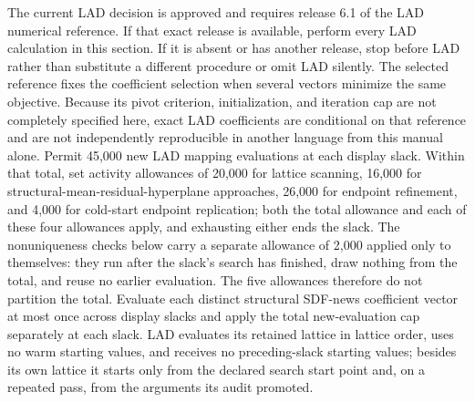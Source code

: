 \documentclass[11pt]{article}
\begin{document}
The current LAD decision is approved and requires release 6.1 of the LAD numerical
reference. If that exact release is available, perform every LAD calculation in this
section. If it is absent or has another release, stop before LAD rather than substitute a different
procedure or omit LAD silently. The selected reference fixes the coefficient selection when several
vectors minimize the same objective. Because its pivot criterion, initialization, and iteration cap
are not completely specified here, exact LAD coefficients are conditional on that reference and are
not independently reproducible in another language from this manual alone.
Permit 45,000 new LAD mapping evaluations at each display slack. Within that total, set activity allowances
of 20,000 for lattice scanning, 16,000 for structural-mean-residual-hyperplane approaches, 26,000 for
endpoint refinement, and 4,000 for cold-start endpoint replication; both the total allowance and each
of these four allowances apply, and exhausting either ends the slack. The nonuniqueness checks below
carry a separate allowance of 2,000 applied only to themselves: they run after the slack's search has
finished, draw nothing from the total, and reuse no earlier evaluation. The five allowances
therefore do not partition the total. Evaluate each distinct structural SDF-news
coefficient vector at most once across display slacks and apply the total new-evaluation cap
separately at each slack. LAD evaluates its retained lattice in lattice order, uses no warm starting
values, and receives no preceding-slack starting values; besides its own lattice it starts only from
the declared search start point and, on a repeated pass, from the arguments its audit promoted.
\end{document}
